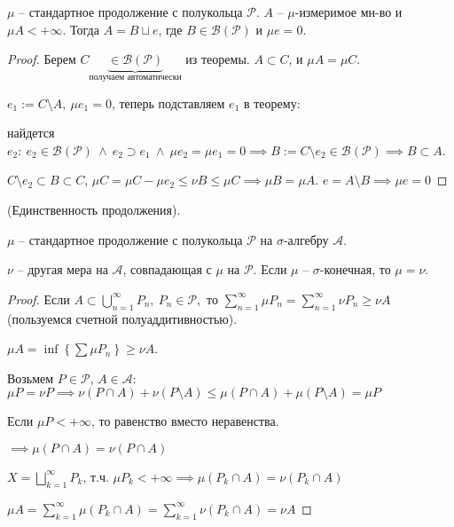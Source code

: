 \begin{consequence}
    $\mu$ -- стандартное продолжение с полукольца $\mathcal{P}$. $A$ -- $\mu$-измеримое мн-во и $\mu A < +\infty$. Тогда $A = B \sqcup e$, где $B \in \mathcal{B}(\mathcal{P})$ и $\mu e = 0$.
\end{consequence}
\begin{proof}
    Берем $C \underbrace{\in \mathcal{B}(\mathcal{P})}_{\text{получаем автоматически}}$ из теоремы. $A \subset C$, и $\mu A = \mu C$.

    $e_1 := C \setminus A, \ \mu e_1 = 0$, теперь подставляем $e_1$ в теорему: 
    
    найдется $e_2: \ e_2 \in \mathcal{B}(\mathcal{P}) \ \land  \ e_2 \supset e_1 \ \land \ \mu e_2 = \mu e_1 = 0 \implies B := C \setminus e_2 \in \mathcal{B}(\mathcal{P}) \implies B \subset A$.

    $C \setminus e_2 \subset B \subset C$, $\mu C = \mu C - \mu e_2 \leq \nu B \leq \mu C \implies \mu B = \mu A$. $e = A \setminus B \implies \mu e = 0$

\end{proof}

\begin{theorem}
    (Единственность продолжения).
    
    $\mu$ -- стандартное продолжение с полукольца $\mathcal{P}$ на $\sigma$-алгебру $\mathcal{A}$.

    $\nu$ -- другая мера на $\mathcal{A}$, совпадающая с $\mu$ на $\mathcal{P}$. Если $\mu$ -- $\sigma$-конечная, то $\mu = \nu$.
\end{theorem}

\begin{proof}
    Если $A \subset \bigcup_{n=1}^{\infty} P_n, \ P_n \in \mathcal{P},$ то $\sum_{n=1}^{\infty} \mu P_n = \sum_{n=1}^{\infty} \nu P_n \geq \nu A$ (пользуемся счетной полуаддитивностью).

    $\mu A = \inf \left\{ \sum \mu P_n \right\} \geq \nu A$.

    Возьмем $P \in \mathcal{P}$, $A \in \mathcal{A}$: $\mu P = \nu P \implies \nu (P \cap A) + \nu (P \setminus A) \leq \mu (P \cap A) + \mu (P \setminus A) = \mu P$

    Если $\mu P < + \infty$, то равенство вместо неравенства.

    $\implies \mu (P \cap A) = \nu (P \cap A)$

    $X = \bigsqcup_{k=1}^{\infty} P_k$, т.ч. $\mu P_k < +\infty \implies \mu (P_k \cap A) = \nu (P_k \cap A)$

    $\mu A = \sum_{k=1}^{\infty} \mu (P_k \cap A) = \sum_{k=1}^{\infty} \nu (P_k \cap A) = \nu A$
\end{proof}


